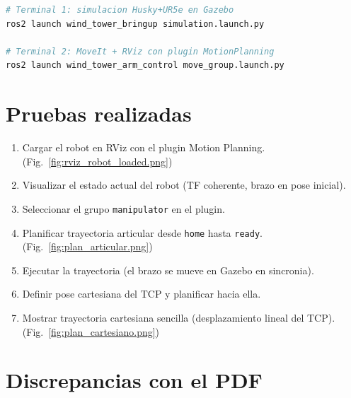 \documentclass[11pt,a4paper]{article}
\begin{document}
\begin{lstlisting}[language=bash,caption={Secuencia minima para ejecutar una demo completa.}]
# Terminal 1: simulacion Husky+UR5e en Gazebo
ros2 launch wind_tower_bringup simulation.launch.py

# Terminal 2: MoveIt + RViz con plugin MotionPlanning
ros2 launch wind_tower_arm_control move_group.launch.py
\end{lstlisting}

\section{Pruebas realizadas}
\label{sec:pruebas}


\begin{enumerate}
  \item Cargar el robot en RViz con el plugin Motion Planning. (Fig.~\ref{fig:rviz_robot_loaded.png})
  \item Visualizar el estado actual del robot (TF coherente, brazo en pose inicial).
  \item Seleccionar el grupo \texttt{manipulator} en el plugin.
  \item Planificar trayectoria articular desde \texttt{home} hasta \texttt{ready}. (Fig.~\ref{fig:plan_articular.png})
  \item Ejecutar la trayectoria (el brazo se mueve en Gazebo en sincronia).
  \item Definir pose cartesiana del TCP y planificar hacia ella.
  \item Mostrar trayectoria cartesiana sencilla (desplazamiento lineal del TCP). (Fig.~\ref{fig:plan_cartesiano.png})
\end{enumerate}



\section{Discrepancias con el PDF}
\label{sec:discrepancias}

\end{document}
